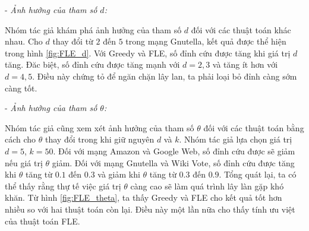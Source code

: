 - {\itshape Ảnh hưởng của tham số $d$:}

Nhóm tác giả khám phá ảnh hưởng của tham số $d$ đối với các thuật toán khác nhau. Cho $d$ thay đổi từ $2$ đến $5$ trong mạng Gnutella, kết quả được thể hiện trong hình \ref{fig:FLE_d}. Với Greedy và FLE, số đỉnh cứu được tăng khi giá trị $d$ tăng. Đăc biệt, số đỉnh cứu được tăng mạnh với $d=2,3$ và tăng ít hơn với $d=4,5$. Điều này chứng tỏ để ngăn chặn lây lan, ta phải loại bỏ đỉnh càng sớm càng tốt.


- {\itshape Ảnh hưởng của tham số $\theta$:}

Nhóm tác giả cũng xem xét ảnh hưởng của tham số $\theta$ đối với các thuật toán bằng cách cho $\theta$ thay đổi trong khi giữ nguyên $d$ và $k$. Nhóm tác giả lựa chọn giá trị $d=5$, $k=50$. Đối với mạng Amazon và Google Web, số đỉnh cứu được sẽ giảm nếu giá trị $\theta$ giảm. Đối với mạng Gnutella và Wiki Vote, số đỉnh cứu được tăng khi $\theta$ tăng từ $0.1$ đến $0.3$ và giảm khi $\theta$ tăng từ $0.3$ đến $0.9$. Tổng quát lại, ta có thể thấy rằng thự tế việc giá trị $\theta$ càng cao sẽ làm quá trình lây làn gặp khó khăn. Từ hình \ref{fig:FLE_theta}, ta thấy Greedy và FLE cho kết quả tốt hơn nhiều so với hai thuật toán còn lại. Điều này một lần nữa cho thấy tính ưu việt của thuật toán FLE.

